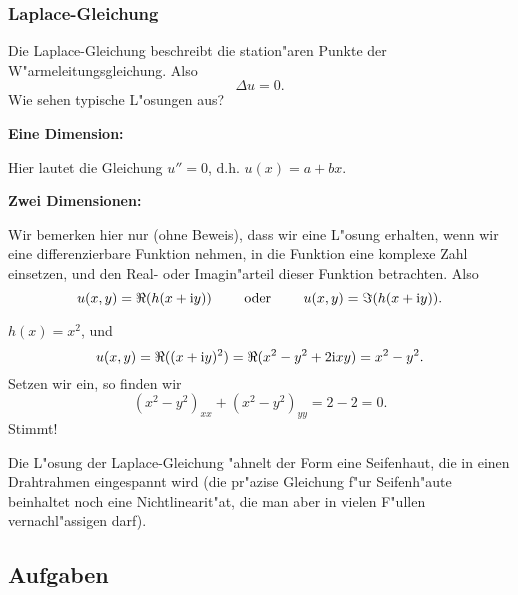 \subsubsection{Laplace-Gleichung}
Die Laplace-Gleichung beschreibt die station"aren Punkte der W"armeleitungsgleichung.
Also
$$ \Delta u = 0.$$
Wie sehen typische L"osungen aus?\par
{\bf Eine Dimension:}\par
Hier lautet die Gleichung $u'' = 0$, d.h. $u(x) = a+b x$.\par\medskip
{\bf Zwei Dimensionen:}\par
Wir bemerken hier nur (ohne Beweis),
dass wir eine L"osung erhalten, 
wenn wir eine differenzierbare Funktion nehmen, in die
Funktion eine komplexe Zahl einsetzen, und den Real- oder Imagin"arteil dieser 
Funktion betrachten.
Also
$$ 
u(x,y) = \Re(h(x+{\rm i} y))
\qquad\mbox{ oder }\qquad
u(x,y) = \Im(h(x+{\rm i} y)).
$$
\begin{bspX}
$h(x) = x^2$, und
$$ u(x,y) = \Re( (x+{\rm i}y)^2 ) = \Re (x^2-y^2+2{\rm i}xy) = x^2-y^2.$$
Setzen wir ein, so finden wir
$$ (x^2-y^2)_{xx}+(x^2-y^2)_{yy} = 2-2 = 0.$$
Stimmt!
\end{bspX}

Die L"osung der Laplace-Gleichung "ahnelt der Form eine Seifenhaut, die 
in einen Drahtrahmen eingespannt wird (die pr"azise Gleichung f"ur Seifenh"aute 
beinhaltet noch eine Nichtlinearit"at, die man aber in vielen F"ullen vernachl"assigen 
darf).
\subsection*{Aufgaben}
\begin{auf}\chc\label{block10A3}

\end{auf}

\begin{auf}\che\label{block10A4}

\end{auf}

\begin{auf}\chb\label{block10A5}

\end{auf}

\begin{auf}\che\label{block10A6}

\end{auf}